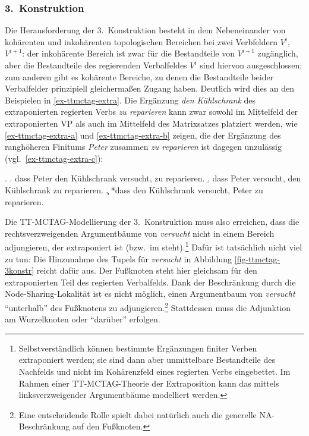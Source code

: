 

\subsubsection{3.~Konstruktion} 
Die Herausforderung der 3.~Konstruktion besteht in dem Nebeneinander von kohärenten und inkohärenten topologischen Bereichen bei zwei Verbfeldern $V^i$, $V^{i+1}$: der inkohärente Bereich ist zwar für die Bestandteile von $V^{i+1}$ zugänglich, aber die Bestandteile des regierenden Verbalfeldes $V^i$ sind hiervon ausgeschlossen; zum anderen gibt es kohärente Bereiche, zu denen die Bestandteile beider Verbalfelder prinzipiell gleicherma\ss en Zugang haben. Deutlich wird dies an den Beispielen in \ref{ex-ttmctag-extra}. Die Ergänzung {\it den Kühlschrank} des extraponierten regierten Verbs {\it zu reparieren} kann zwar sowohl im Mittelfeld der extraponierten VP als auch im Mittelfeld des Matrixsatzes platziert werden, wie \ref{ex-ttmctag-extra-a} und \ref{ex-ttmctag-extra-b} zeigen, die  der Ergänzung des ranghöheren Finitums {\it Peter} zusammen \textit{zu reparieren} ist dagegen unzulässig (vgl.\ \ref{ex-ttmctag-extra-c}): 


\largerpage
\ex. \label{ex-ttmctag-extra}
\a. dass Peter den Kühlschrank versucht, zu reparieren. \label{ex-ttmctag-extra-a}
\b. dass Peter versucht, den Kühlschrank zu reparieren. \label{ex-ttmctag-extra-b}
\c. *dass den Kühlschrank versucht, Peter zu reparieren. \label{ex-ttmctag-extra-c}

Die TT-MCTAG-Modellierung der 3.~Konstruktion muss also erreichen, dass die rechtsverzweigenden Argumentbäume von {\it versucht} nicht in einem Bereich adjungieren, der extraponiert ist (bzw.\ im  steht).\footnote{Selbstverständlich können bestimmte Ergänzungen finiter Verben extraponiert werden; sie sind dann aber unmittelbare Bestandteile des Nachfelds und nicht im Kohärenzfeld eines regierten Verbs eingebettet. Im Rahmen einer TT-MCTAG-Theorie der Extraposition kann das mittels linksverzweigender Argumentbäume modelliert werden.} Dafür ist tatsächlich nicht viel zu tun: Die Hinzunahme des Tupels für {\it versucht} in Abbildung \ref{fig-ttmctag-3konstr} reicht dafür aus. Der Fu\ss knoten steht hier gleichsam für den extraponierten Teil des regierten Verbalfelds. Dank der Beschränkung durch die Node-Sharing-Lokalität ist es nicht möglich, einen Argumentbaum von {\it versucht} "`unterhalb"' des Fu\ss knotens zu adjungieren.\footnote{Eine entscheidende Rolle spielt dabei natürlich auch die generelle NA-Beschränkung auf den Fu\ss knoten.} Stattdessen muss die Adjunktion am Wurzelknoten oder "`darüber"' erfolgen. 


